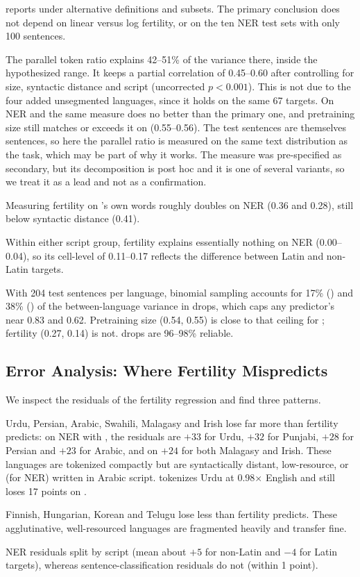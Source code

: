 

 reports \rsq under alternative definitions and subsets.
The primary conclusion does not depend on linear versus log fertility, or on the ten NER test sets with only 100 sentences.

The parallel token ratio explains 42--51\% of the variance there, inside the hypothesized range.
It keeps a partial correlation of 0.45--0.60 after controlling for size, syntactic distance and script (uncorrected $p<0.001$).
This is not due to the four added unsegmented languages, since it holds on the same 67 targets.
On NER and \xnli the same measure does no better than the primary one, and pretraining size still matches or exceeds it on \sib (0.55--0.56).
The \sib test sentences are themselves \flores sentences, so here the parallel ratio is measured on the same text distribution as the task, which may be part of why it works.
The measure was pre-specified as secondary, but its decomposition is post hoc and it is one of several variants, so we treat it as a lead and not as a confirmation.

Measuring fertility on \wikiann's own words roughly doubles \rsq on NER (0.36 and 0.28), still below syntactic distance (0.41).

Within either script group, fertility explains essentially nothing on NER (0.00--0.04), so its cell-level \rsq of 0.11--0.17 reflects the difference between Latin and non-Latin targets.

With 204 test sentences per language, binomial sampling accounts for 17\% (\mbert) and 38\% (\xlmr) of the between-language variance in \sib drops, which caps any predictor's \rsq near 0.83 and 0.62.
Pretraining size (0.54, 0.55) is close to that ceiling for \xlmr; fertility (0.27, 0.14) is not.
\xnli drops are 96--98\% reliable.

\subsection{Error Analysis: Where Fertility Mispredicts}
We inspect the residuals of the fertility regression and find three patterns.

Urdu, Persian, Arabic, Swahili, Malagasy and Irish lose far more than fertility predicts: on NER with \mbert, the residuals are $+33$ for Urdu, $+32$ for Punjabi, $+28$ for Persian and $+23$ for Arabic, and on \sib $+24$ for both Malagasy and Irish.
These languages are tokenized compactly but are syntactically distant, low-resource, or (for NER) written in Arabic script.
\xlmr tokenizes Urdu at 0.98$\times$ English and still loses 17 points on \xnli.

Finnish, Hungarian, Korean and Telugu lose less than fertility predicts.
These agglutinative, well-resourced languages are fragmented heavily and transfer fine.

NER residuals split by script (mean about $+5$ for non-Latin and $-4$ for Latin targets), whereas sentence-classification residuals do not (within 1 point).
